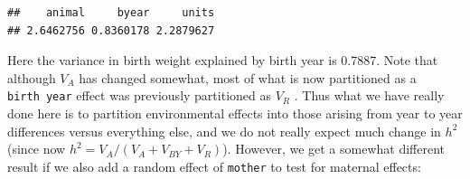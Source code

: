 \documentclass[
  12pt,
]{book}
\newenvironment{Shaded}{\begin{snugshade}}{\end{snugshade}}
\newcommand{\AttributeTok}[1]{\textcolor[rgb]{0.77,0.63,0.00}{#1}}
\newcommand{\ConstantTok}[1]{\textcolor[rgb]{0.00,0.00,0.00}{#1}}
\newcommand{\DecValTok}[1]{\textcolor[rgb]{0.00,0.00,0.81}{#1}}
\newcommand{\FloatTok}[1]{\textcolor[rgb]{0.00,0.00,0.81}{#1}}
\newcommand{\FunctionTok}[1]{\textcolor[rgb]{0.00,0.00,0.00}{#1}}
\newcommand{\NormalTok}[1]{#1}
\newcommand{\OtherTok}[1]{\textcolor[rgb]{0.56,0.35,0.01}{#1}}
\newcommand{\SpecialCharTok}[1]{\textcolor[rgb]{0.00,0.00,0.00}{#1}}
\begin{document}
\begin{Shaded}
\end{Shaded}

\begin{verbatim}
##    animal     byear     units 
## 2.6462756 0.8360178 2.2879627
\end{verbatim}

Here the variance in birth weight explained by birth year is 0.7887. Note that although \(V_A\) has changed somewhat, most of what is now partitioned as a \texttt{birth\ year} effect was previously partitioned as \(V_R\) . Thus what we have really done here is to partition environmental effects into those arising from year to year differences versus everything else, and we do not really expect much change in \(h^2\) (since now \(h^2 = V_A /(V_A + V_{BY} + V_R )\)). However, we get a somewhat different result if we also add a random effect of \texttt{mother} to test for maternal effects:
\end{document}
